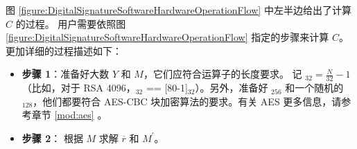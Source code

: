 \documentclass[main\_\_CN.tex]{subfiles}
\begin{document}
图 \ref{figure:DigitalSignatureSoftwareHardwareOperationFlow} 中左半边给出了计算 \begin{math}C\end{math} 的过程。
用户需要依照图 \ref{figure:DigitalSignatureSoftwareHardwareOperationFlow} 指定的步骤来计算 \begin{math}C\end{math}。
更加详细的过程描述如下：

\begin{itemize}

    \item {\bfseries 步骤 1}：准备好大数 \begin{math}Y\end{math} 和 \begin{math}M\end{math}，它们应符合运算子的长度要求。
          记 \begin{math}[L]_{32} = \frac{N}{32}-1 \end{math}（比如，对于 RSA 4096，\begin{math}[L]_{32}\end{math} == [\hexprefix{}80-1]\begin{math}_{32}\end{math}）。另外，准备好 \begin{math}[RSA\_DS\_KEY]_{256}\end{math} 和一个随机的 \begin{math}[IV]_{128}\end{math}，他们都要符合 AES-CBC 块加密算法的要求。有关 AES 更多信息，请参考章节 \ref{mod:aes} \textit{}。

    \item \label{Extract M_prime and Rb} {\bfseries 步骤 2}：
          根据 \begin{math}M\end{math} 求解 \begin{math}\overline{r}\end{math} 和 \begin{math}M^{\prime} \end{math}。


\end{itemize}
\end{document}
